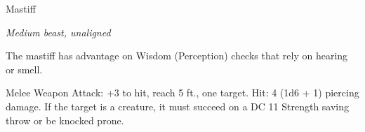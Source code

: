 \begin{monsterbox}{Mastiff}
\begin{hangingpar}
\textit{Medium beast, unaligned}
\end{hangingpar}
\dndline%
\basics[%
armorclass = 12,
hitpoints = 1d8 + 1,
speed = {40 ft.}
]
\dndline%
\stats[%
STR = \stat{13},
DEX = \stat{14},
CON = \stat{12},
INT = \stat{3},
WIS = \stat{12},
CHA = \stat{7}
]
\dndline%
\details[%
skills={Perception +3, },
damageimmunities={},
savingthrows={},
conditionimmunities={},
damageresistances={},
damagevulnerabilities={},
senses={passive Perception 13},
challenge=1/8
]
\dndline%
\begin{monsteraction}
The mastiff has advantage on Wisdom (Perception) checks that rely on hearing or smell.
\end{monsteraction}
\begin{monsteraction}[Bite]
Melee Weapon Attack: +3 to hit, reach 5 ft., one target. Hit: 4 (1d6 + 1) piercing damage. If the target is a creature, it must succeed on a DC 11 Strength saving throw or be knocked prone.
\end{monsteraction}
\end{monsterbox}
